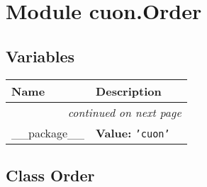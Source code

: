 %
%
%


\section{Module cuon.Order}

    \label{cuon:Order}


  \subsection{Variables}

    \vspace{-1cm}
\hspace{\varindent}\begin{longtable}{|p{\varnamewidth}|p{\vardescrwidth}|l}
\cline{1-2}
\cline{1-2} \centering \textbf{Name} & \centering \textbf{Description}& \\
\cline{1-2}
\endhead\cline{1-2}\multicolumn{3}{r}{\small\textit{continued on next page}}\\\endfoot\cline{1-2}
\endlastfoot\raggedright \_\-\_\-p\-a\-c\-k\-a\-g\-e\-\_\-\_\- & \raggedright \textbf{Value:} 
{\tt \texttt{'}\texttt{cuon}\texttt{'}}&\\
\cline{1-2}
\end{longtable}



\subsection{Class Order}

